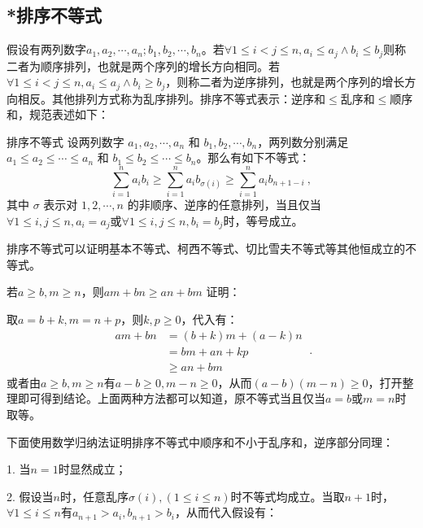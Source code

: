 \subsection{*排序不等式}

假设有两列数字$a_1,a_2,\cdots,a_n;b_1,b_2,\cdots,b_n$。若$\forall 1\leq i<j\leq n,a_i\leq a_j\land b_i\leq b_j$则称二者为顺序排列，也就是两个序列的增长方向相同。若$\forall 1\leq i<j\leq n,a_i\leq a_j\land b_i\geq b_j$，则称二者为逆序排列，也就是两个序列的增长方向相反。其他排列方式称为乱序排列。排序不等式表示：逆序和$\leq$乱序和$\leq$顺序和，规范表述如下：

\begin{theorem}{排序不等式}
设两列数字 $a_1, a_2, \cdots, a_n$ 和 $b_1, b_2, \cdots, b_n$，两列数分别满足 $a_1 \leq a_2 \leq \cdots \leq a_n$ 和 $b_1 \leq b_2 \leq \cdots \leq b_n$。那么有如下不等式：
\begin{equation}
\sum_{i=1}^n a_i b_i \geq \sum_{i=1}^n a_i b_{\sigma(i)} \geq \sum_{i=1}^n a_i b_{n+1-i}~,
\end{equation}
其中 $\sigma$ 表示对 ${1, 2, \cdots, n}$ 的非顺序、逆序的任意排列，当且仅当$\forall 1\leq i,j\leq n,a_i=a_j$或$\forall 1\leq i,j\leq n,b_i=b_j$时，等号成立。
\end{theorem}

排序不等式可以证明基本不等式、柯西不等式、切比雪夫不等式等其他恒成立的不等式。

\begin{lemma}{若$a\geq b,m\geq n$，则$am+bn\geq an+bm$}\label{lem_HsEquN_1}
证明：

取$a=b+k,m=n+p$，则$k,p\geq0$，代入有：
\begin{equation}
\begin{split}
am+bn&= (b+k)m+(a-k)n \\ 
&= bm+an+kp \\
&\geq an+bm
\end{split}~.
\end{equation}
或者由$a\geq b,m\geq n$有$a-b\geq 0,m- n\geq0$，从而$(a-b)(m- n)\geq0$，打开整理即可得到结论。上面两种方法都可以知道，原不等式当且仅当$a=b$或$m=n$时取等。
\end{lemma}

下面使用数学归纳法证明排序不等式中顺序和不小于乱序和，逆序部分同理：

1. 当$n=1$时显然成立；

2. 假设当$n$时，任意乱序$\sigma(i),(1\leq i\leq n)$时不等式均成立。当取$n+1$时，$\forall 1\leq i\leq n$有$a_{n+1}>a_i,b_{n+1}>b_i$，从而代入假设有：

